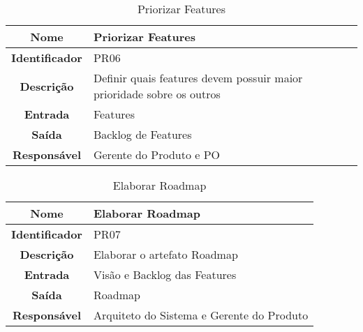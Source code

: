 {              \begin{table}[H]
                \centering
                \caption{Priorizar Features}
                \begin{tabular}{c|p{10cm}}
                    \hline
                    \textbf{Nome}            & Priorizar Features\\
                    \hline
                    \textbf{Identificador} & PR06\\
                    \hline
                    \textbf{Descrição}   & Definir quais features devem possuir maior prioridade sobre os outros\\
                    \hline
                    \textbf{Entrada}           & Features\\
                    \hline
                    \textbf{Saída}            &  Backlog de Features\\
                    \hline
                    \textbf{Responsável}            & Gerente do Produto e PO\\
                    \hline
                \end{tabular}
            \end{table}

              \begin{table}[H]
                \centering
                \caption{Elaborar Roadmap}
                \begin{tabular}{c|p{10cm}}
                    \hline
                    \textbf{Nome}            & Elaborar Roadmap\\
                    \hline
                    \textbf{Identificador} & PR07\\
                    \hline
                    \textbf{Descrição}   & Elaborar o artefato Roadmap\\
                    \hline
                    \textbf{Entrada}           & Visão e Backlog das Features\\
                    \hline
                    \textbf{Saída}            &  Roadmap\\
                    \hline
                    \textbf{Responsável}            & Arquiteto do Sistema e Gerente do Produto\\
                    \hline
                \end{tabular}
            \end{table}

}
